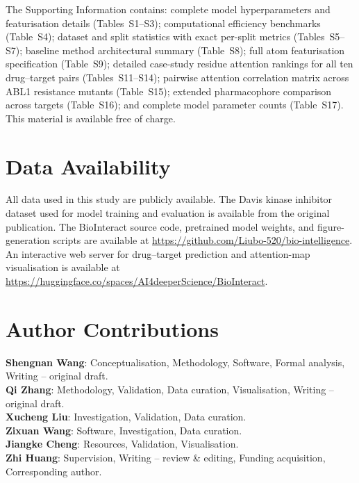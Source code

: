 \documentclass[fleqn,10pt]{wlscirep}
\begin{document}
The Supporting Information contains: complete model hyperparameters and
featurisation details (Tables~S1--S3); computational efficiency benchmarks
(Table~S4); dataset and split statistics with exact per-split metrics
(Tables~S5--S7); baseline method architectural summary (Table~S8);
full atom featurisation specification (Table~S9); detailed case-study residue
attention rankings for all ten drug--target pairs (Tables~S11--S14);
pairwise attention correlation matrix across ABL1 resistance mutants
(Table~S15); extended pharmacophore comparison across targets (Table~S16);
and complete model parameter counts (Table~S17).
This material is available free of charge.

\section*{Data Availability}

All data used in this study are publicly available. The Davis kinase inhibitor
dataset used for model training and evaluation is available from the original
publication.\cite{davis2011comprehensive} The BioInteract source code,
pretrained model weights, and figure-generation scripts are available at
\url{https://github.com/Liubo-520/bio-intelligence}. An interactive web
server for drug--target prediction and attention-map visualisation is available
at \url{https://huggingface.co/spaces/AI4deeperScience/BioInteract}.

\section*{Author Contributions}

\textbf{Shengnan Wang}: Conceptualisation, Methodology, Software, Formal
analysis, Writing -- original draft. \\
\textbf{Qi Zhang}: Methodology, Validation, Data curation, Visualisation,
Writing -- original draft. \\
\textbf{Xucheng Liu}: Investigation, Validation, Data curation. \\
\textbf{Zixuan Wang}: Software, Investigation, Data curation. \\
\textbf{Jiangke Cheng}: Resources, Validation, Visualisation. \\
\textbf{Zhi Huang}: Supervision, Writing -- review \& editing, Funding
acquisition, Corresponding author.
\end{document}
